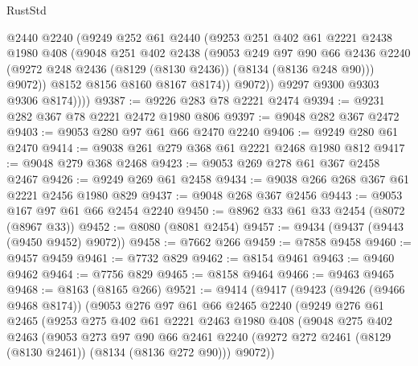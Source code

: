 \begin{lexlean}{RustStd}
\begin{coremodule}
                @2440
                @2240
                (@9249
                  @252
                  @61
                  @2440
                  (@9253
                    @251
                    @402
                    @61
                    @2221
                    @2438
                    @1980
                    @408
                    (@9048
                      @251
                      @402
                      @2438
                      (@9053
                        @249
                        @97
                        @90
                        @66
                        @2436
                        @2240
                        (@9272 @248 @2436 (@8129 (@8130 @2436)) (@8134 (@8136 @248 @90)))
                        @9072))
                    @8152
                    @8156
                    @8160
                    @8167
                    @8174))
                @9072))
            @9297
            @9300
            @9303
            @9306
            @8174))))
@9387 := @9226 @283 @78 @2221 @2474
@9394 := @9231 @282 @367 @78 @2221 @2472 @1980 @806
@9397 := @9048 @282 @367 @2472
@9403 := @9053 @280 @97 @61 @66 @2470 @2240
@9406 := @9249 @280 @61 @2470
@9414 := @9038 @261 @279 @368 @61 @2221 @2468 @1980 @812
@9417 := @9048 @279 @368 @2468
@9423 := @9053 @269 @278 @61 @367 @2458 @2467
@9426 := @9249 @269 @61 @2458
@9434 := @9038 @266 @268 @367 @61 @2221 @2456 @1980 @829
@9437 := @9048 @268 @367 @2456
@9443 := @9053 @167 @97 @61 @66 @2454 @2240
@9450 := @8962 @33 @61 @33 @2454 (@8072 (@8967 @33))
@9452 := @8080 (@8081 @2454)
@9457 := @9434 (@9437 (@9443 (@9450 @9452) @9072))
@9458 := @7662 @266
@9459 := @7858 @9458
@9460 := @9457 @9459
@9461 := @7732 @829
@9462 := @8154 @9461
@9463 := @9460 @9462
@9464 := @7756 @829
@9465 := @8158 @9464
@9466 := @9463 @9465
@9468 := @8163 (@8165 @266)
@9521 := @9414
    (@9417
      (@9423
        (@9426 (@9466 @9468 @8174))
        (@9053
          @276
          @97
          @61
          @66
          @2465
          @2240
          (@9249
            @276
            @61
            @2465
            (@9253
              @275
              @402
              @61
              @2221
              @2463
              @1980
              @408
              (@9048
                @275
                @402
                @2463
                (@9053
                  @273
                  @97
                  @90
                  @66
                  @2461
                  @2240
                  (@9272 @272 @2461 (@8129 (@8130 @2461)) (@8134 (@8136 @272 @90)))
                  @9072))

\end{coremodule}
\end{lexlean}
